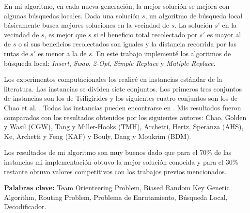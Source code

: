 \bigskip

En mi algoritmo, en cada nueva generación, la mejor solución se mejora con algunas búsquedas locales. Dada una solución $s$, un algoritmo de búsqueda local básicamente busca mejores soluciones en la vecindad de $s$. La solución $s'$ en la vecindad de $s$, es mejor que $s$ si el beneficio total recolectado por $s'$ es mayor al de $s$ o si sus beneficios recolectados son iguales y la distancia recorrida por las rutas de $s'$ es menor a la de $s$. En este trabajo implementé los algoritmos de búsqueda local: \textit{Insert}, \textit{Swap}, \textit{2-Opt}, \textit{Simple Replace} y \textit{Mutiple Replace}.

\bigskip

Los experimentos computacionales los realicé en instancias estándar de la literatura. Las instancias se dividen siete conjuntos. Los primeros tres conjuntos de instancias son los de Tsiligirides \cite{Tsiligirides} y los siguientes cuatro conjuntos son los de Chao et al. \cite{ChaoGoldenWasil}. Todas las instancias pueden encontrarse en \cite{IntancesChaoTsiligirides}. Mis resultados fueron comparados con los resultados obtenidos por los siguientes autores: Chao, Golden y Wasil \cite{ChaoGoldenWasil} (CGW), Tang y Miller-Hooks \cite{TangMillerHooks} (TMH), Archetti, Hertz, Speranza \cite{ArchettiHertzSperanza} (AHS), Ke, Archetti y Feng \cite{KeArchettiFeng} (KAF) y Bouly, Dang y Moukrim \cite{BoulyDangMoukrim} (BDM). 

\bigskip

Los resultados de mi algoritmo son muy buenos dado que para el 70\% de las instancias mi implementación obtuvo la mejor solución conocida y para el 30\% restante obtuvo valores competitivos con los trabajos previos mencionados.

\bigskip

\noindent\textbf{Palabras clave:} Team Orienteering Problem, Biased Random Key Genetic Algorithm, Routing Problem, Problema de Enrutamiento, Búsqueda Local, Decodificador.